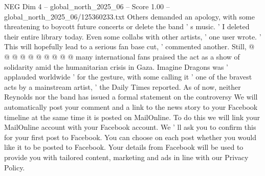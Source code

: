 \begin{textsample}{NEG Dim 4 – global\_north\_2025\_06 – Score 1.00 – global\_north\_2025\_06/125360233.txt}
Others demanded an apology, with some threatening to boycott future concerts or delete the band ' s music. ' I deleted their entire library today.
Even some collabs with other artists, ' one user wrote. ' This will hopefully lead to a serious fan base cut, ' commented another.
Still, @ @ @ @ @ @ @ @ @ @ many international fans praised the act as a show of solidarity amid the humanitarian crisis in Gaza.
Imagine Dragons was ' applauded worldwide ' for the gesture, with some calling it ' one of the bravest acts by a mainstream artist, ' the Daily Times reported.
As of now, neither Reynolds nor the band has issued a formal statement on the controversy We will automatically post your comment and a link to the news story to your Facebook timeline at the same time it is posted on MailOnline.
To do this we will link your MailOnline account with your Facebook account.
We ' ll ask you to confirm this for your first post to Facebook.
You can choose on each post whether you would like it to be posted to Facebook.
Your details from Facebook will be used to provide you with tailored content, marketing and ads in line with our Privacy Policy.

\end{textsample}
